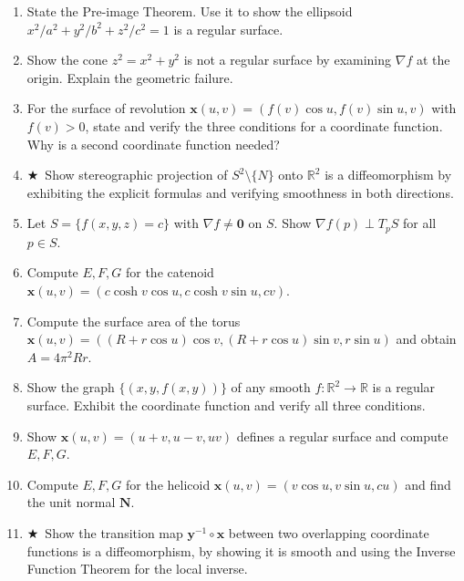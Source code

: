 \documentclass[11pt, a4paper]{article}
\newcommand{\R}{\mathbb{R}}
\newcommand{\hard}{$\bigstar$\ }
\begin{document}
\begin{enumerate}[label=\textbf{Q\arabic*.}, leftmargin=*, itemsep=6pt]

\item State the Pre-image Theorem. Use it to show the ellipsoid $x^2/a^2+y^2/b^2+z^2/c^2=1$ is a regular surface.

\item Show the cone $z^2=x^2+y^2$ is not a regular surface by examining $\nabla f$ at the origin. Explain the geometric failure.

\item For the surface of revolution $\mathbf{x}(u,v)=(f(v)\cos u, f(v)\sin u, v)$ with $f(v)>0$, state and verify the three conditions for a coordinate function. Why is a second coordinate function needed?

\item \hard Show stereographic projection of $S^2\setminus\{N\}$ onto $\R^2$ is a diffeomorphism by exhibiting the explicit formulas and verifying smoothness in both directions.

\item Let $S=\{f(x,y,z)=c\}$ with $\nabla f\neq\mathbf{0}$ on $S$. Show $\nabla f(p)\perp T_pS$ for all $p\in S$.

\item Compute $E,F,G$ for the catenoid $\mathbf{x}(u,v)=(c\cosh v\cos u, c\cosh v\sin u, cv)$.

\item Compute the surface area of the torus $\mathbf{x}(u,v)=((R+r\cos u)\cos v, (R+r\cos u)\sin v, r\sin u)$ and obtain $A=4\pi^2 Rr$.

\item Show the graph $\{(x,y,f(x,y))\}$ of any smooth $f:\R^2\to\R$ is a regular surface. Exhibit the coordinate function and verify all three conditions.

\item Show $\mathbf{x}(u,v)=(u+v, u-v, uv)$ defines a regular surface and compute $E,F,G$.

\item Compute $E,F,G$ for the helicoid $\mathbf{x}(u,v)=(v\cos u, v\sin u, cu)$ and find the unit normal $\mathbf{N}$.

\item \hard Show the transition map $\mathbf{y}^{-1}\circ\mathbf{x}$ between two overlapping coordinate functions is a diffeomorphism, by showing it is smooth and using the Inverse Function Theorem for the local inverse.


\end{enumerate}
\end{document}
